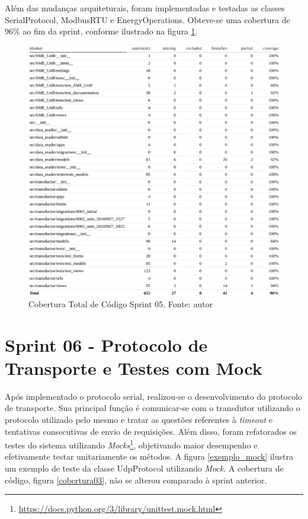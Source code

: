 Além das mudanças arquiteturais, foram implementadas e testadas as classes SerialProtocol, ModbusRTU e EnergyOperations. Obteve-se uma cobertura de 96\% ao fim da sprint, conforme ilustrado na figura \ref{cobertura02}.
\begin{figure}[!htpb]
    \centering
    \includegraphics[keepaspectratio=true,scale=0.6]{figuras/cobertura02.eps}
    \caption{Cobertura Total de Código Sprint 05. Fonte: autor}
    \label{cobertura02}
\end{figure}

\section{Sprint 06 - Protocolo de Transporte e Testes com Mock}
Após implementado o protocolo serial, realizou-se o desenvolvimento do protocolo de transporte. Sua principal função é comunicar-se com o transdutor utilizando o protocolo utilizado pelo mesmo e tratar as questões referentes à \textit{timeout} e tentativas consecutivas de envio de requisições. Além disso, foram refatorados os testes do sistema utilizando \textit{Mocks}\footnote{\url{https://docs.python.org/3/library/unittest.mock.html}}, objetivando maior desempenho e efetivamente testar unitariamente os métodos. A figura \ref{exemplo_mock} ilustra um exemplo de teste da classe UdpProtocol utilizando \textit{Mock}. A cobertura de código, figura \ref{cobertura03}, não se alterou comparado à sprint anterior.

